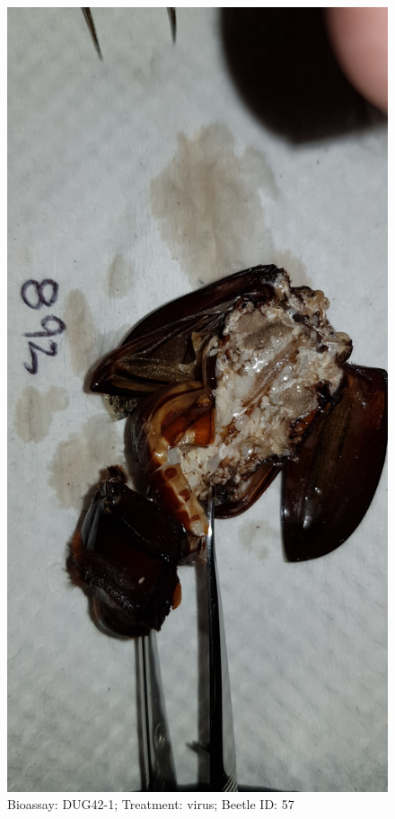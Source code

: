 \documentclass[11pt]{scrartcl}
\begin{document}
\begin{figure}[h!]
    \centering
    \includegraphics[width=\linewidth, height=\textheight, keepaspectratio]{uploads/btl.pm_image.8d9812a2fc21c8a6.4475673432203839325f5265702d312076697275732e6a7067.jpg}
    \caption{Bioassay: DUG42-1; Treatment: virus; Beetle ID: 57}
\end{figure}
\clearpage
\end{document}
